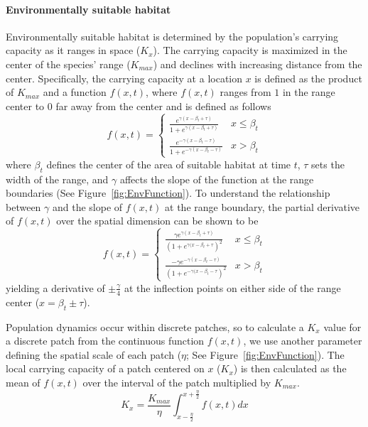 \documentclass[12pt, oneside]{article}
\begin{document}
\paragraph{Environmentally suitable habitat}
Environmentally suitable habitat is determined by the population's carrying capacity as it ranges in space ($K_{x}$). The carrying capacity is maximized in the center of the species' range ($K_{max}$) and declines with increasing distance from the center. Specifically, the carrying capacity at a location $x$ is defined as the product of $K_{max}$ and a function $f(x,t)$, where $f(x,t)$ ranges from $1$ in the range center to $0$ far away from the center and is defined as follows 
\begin{equation}
f(x,t)=
\begin{cases}
	\frac{e^{\gamma(x-\beta_{t}+\tau)}}{1+e^{\gamma(x-\beta_{t}+\tau)}} & x \leq \beta_{t} \\
	\frac{e^{-\gamma(x-\beta_{t}-\tau)}}{1+e^{-\gamma(x-\beta_{t}-\tau)}} & x > \beta_{t}
\end{cases}
\end{equation}
where $\beta_{t}$ defines the center of the area of suitable habitat at time $t$, $\tau$ sets the width of the range, and $\gamma$ affects the slope of the function at the range boundaries (See Figure~\ref{fig:EnvFunction}). To understand the relationship between $\gamma$ and the slope of $f(x,t)$ at the range boundary, the partial derivative of $f(x,t)$ over the spatial dimension can be shown to be
\begin{equation}
f(x,t)=
\begin{cases}
	\frac{\gamma e^{\gamma(x-\beta_{t}+\tau)}}{(1+e^{\gamma(x-\beta_{t}+\tau})^{2}} & x \leq \beta_{t} \\
	\frac{-\gamma e^{-\gamma(x-\beta_{t}-\tau)}}{(1+e^{-\gamma(x-\beta_{t}-\tau})^{2}} & x > \beta_{t}
\end{cases}	
\end{equation}
yielding a derivative of $\pm\frac{\gamma}{4}$ at the inflection points on either side of the range center ($x=\beta_{t}\pm\tau$).

Population dynamics occur within discrete patches, so to calculate a $K_{x}$ value for a discrete patch from the continuous function $f(x,t)$, we use another parameter defining the spatial scale of each patch ($\eta$; See Figure~\ref{fig:EnvFunction}). The local carrying capacity of a patch centered on $x$ ($K_{x}$) is then calculated as the mean of $f(x,t)$ over the interval of the patch multiplied by $K_{max}$.
\begin{equation}
K_{x} = \frac{K_{max}}{\eta}\int_{x-\frac{\eta}{2}}^{x+\frac{\eta}{2}}f(x,t)dx
\end{equation}
\end{document}

